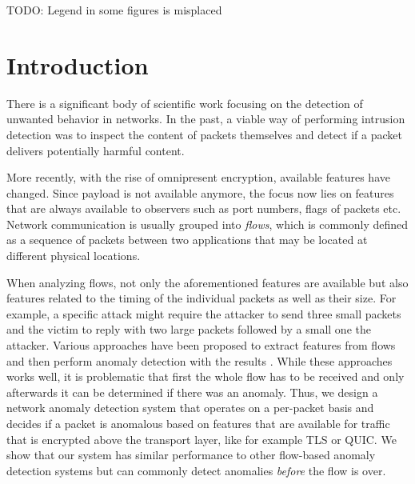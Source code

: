 \documentclass[conference]{IEEEtran}
\newcommand\note[2]{{\color{#1}#2}}
\newcommand\todo[1]{{\note{red}{TODO: #1}}}
\begin{document}

\maketitle

\todo{Legend in some figures is misplaced}

\section{Introduction}

There is a significant body of scientific work focusing on the detection of unwanted behavior in networks. In the past, a viable way of performing intrusion detection was to inspect the content of packets themselves and detect if a packet delivers potentially harmful content.

More recently, with the rise of omnipresent encryption, available features have changed. Since payload is not available anymore, the focus now lies on features that are always available to observers such as port numbers, flags of packets etc. Network communication is usually grouped into \textit{flows}, which is commonly defined as a sequence of packets between two applications that may be located at different physical locations.

When analyzing flows, not only the aforementioned features are available but also features related to the timing of the individual packets as well as their size. For example, a specific attack might require the attacker to send three small packets and the victim to reply with two large packets followed by a small one the attacker. Various approaches have been proposed to extract features from flows and then perform anomaly detection with the results \cite{meghdouri_analysis_2018}. While these approaches works well, it is problematic that first the whole flow has to be received and only afterwards it can be determined if there was an anomaly. Thus, we design a network anomaly detection system that operates on a per-packet basis and decides if a packet is anomalous based on features that are available for traffic that is encrypted above the transport layer, like for example TLS or QUIC.
We show that our system has similar performance to other flow-based anomaly detection systems but can commonly detect anomalies \textit{before} the flow is over. 
\end{document}
